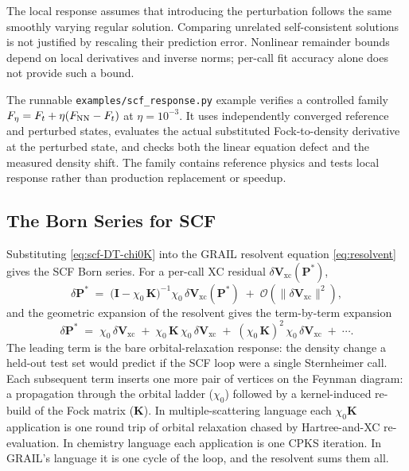 \documentclass[11pt]{article}
\newcommand{\code}[1]{\texttt{#1}}
\begin{document}
The local response assumes that introducing the perturbation follows the
same smoothly varying regular solution. Comparing unrelated self-consistent
solutions is not justified by rescaling their prediction error. Nonlinear
remainder bounds depend on local derivatives and inverse norms; per-call
fit accuracy alone does not provide such a bound.

The runnable \code{examples/scf\_response.py} example verifies a controlled
family $F_\eta=F_t+\eta(F_{\rm NN}-F_t)$ at $\eta=10^{-3}$. It uses
independently converged reference and perturbed states, evaluates the
actual substituted Fock-to-density derivative at the perturbed state,
and checks both the linear equation defect and the measured density shift.
The family contains reference physics and tests local response rather
than production replacement or speedup.

\subsection{The Born Series for SCF}
\label{sec:scf-born}

Substituting \eqref{eq:scf-DT-chi0K} into the GRAIL resolvent
equation \eqref{eq:resolvent} gives the SCF Born series.  For a
per-call XC residual $\delta\mathbf{V}_{\text{xc}}(\mathbf{P}^{*})$,
\begin{equation}
\delta\mathbf{P}^{*}
\;=\;
\bigl(\mathbf{I} - \chi_0\,\mathbf{K}\bigr)^{-1} \chi_0\,
\delta\mathbf{V}_{\text{xc}}(\mathbf{P}^{*})
\;+\; \mathcal{O}\!\left(\|\delta\mathbf{V}_{\text{xc}}\|^{2}\right) ,
\label{eq:scf-resolvent}
\end{equation}
and the geometric expansion of the resolvent gives the term-by-term
expansion
\begin{equation}
\delta\mathbf{P}^{*}
\;=\;
\chi_0\,\delta\mathbf{V}_{\text{xc}}
\;+\;
\chi_0\,\mathbf{K}\,\chi_0\,\delta\mathbf{V}_{\text{xc}}
\;+\;
(\chi_0\,\mathbf{K})^{2}\,\chi_0\,\delta\mathbf{V}_{\text{xc}}
\;+\; \cdots .
\label{eq:scf-born}
\end{equation}
The leading term is the bare orbital-relaxation response: the
density change a held-out test set would predict if the SCF loop
were a single Sternheimer call.  Each subsequent term inserts one
more pair of vertices on the Feynman diagram: a propagation through
the orbital ladder ($\chi_0$) followed by a kernel-induced
re-build of the Fock matrix ($\mathbf{K}$).  In multiple-scattering
language each $\chi_0\mathbf{K}$ application is one round trip of
orbital relaxation chased by Hartree-and-XC re-evaluation.  In
chemistry language each application is one CPKS iteration.  In
GRAIL's language it is one cycle of the loop, and the resolvent
sums them all.
\end{document}
